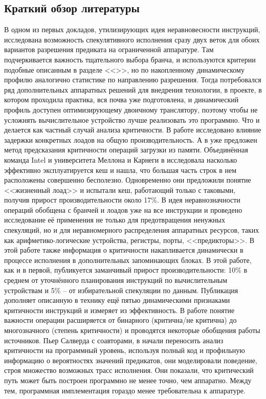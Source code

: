\documentclass[a4paper,12pt,titlepage]{article}
\newcommand*{\chp}[1]{<<\nameref{chap:#1}>>}
\begin{document}
\subsection{Краткий обзор литературы}
В одном из первых докладов, утилизирующих идея неравновесности инструкций, \cite{dualpath} исследована возможность спекулятивного исполнения сразу двух веток для обоих вариантов разрешения предиката на ограниченной аппаратуре. Там подчеркивается важность тщательного выбора бранча, и используются критерии подобные описанным в разделе \chp{statsign}, но по накопленному динамическому профилю аналогично статистике по направлению разрешения.
Тогда потребовался ряд дополнительных аппаратных решений для внедрения технологии, в проекте, в котором проходила практика, вся почва уже подготовлена, и динамический профиль доступен оптимизирующему двоичному транслятору, поэтому чтобы не усложнять вычислительное устройство лучше реализовать это программно. Что и делается как частный случай анализа критичности. В работе \cite{loads} исследовано влияние задержки конкретных лоадов на общую производительность. А в \cite{localvscritical} уже предложен метод предсказания критичности операций загрузки из памяти. Объединённая команда Intel и университета Меллона и Карнеги в \cite{nonvital} исследовала насколько эффективно эксплуатируется кеш и нашла, что большая часть строк в нем расположены совершенно бесполезно. Одновременно они предложили понятие <<жизненный лоад>> и испытали кеш, работающий только с таковыми, получив прирост производительности около 17\%.
В \cite{isca} идея неравнозначности операций обобщена с бранчей и лоадов уже на все инструкции и проведено исследование её применения не только для предотвращения ненужных спекуляций, но и для неравномерного распределения аппаратных ресурсов, таких как арифметико-логические устройства, регистры, порты, <<предикторы>>. В этой работе также информация о критичности накапливается динамически в процессе исполнения в дополнительных запоминающих блоках. В этой работе, как и в первой, публикуется заманчивый прирост производительности: 10\% в среднем от уточнённого планирования инструкций по вычислительным устройствам и 5\% -- от избирательной спекуляции по данным.
Публикация \cite{dynpred} дополняет описанную в \cite{isca} технику ещё пятью динамическими признаками критичности инструкций и измеряет из эффективность. В работе \cite{pact} понятие важности операции расширяется от бинарного (критична/не критична) до многозначного (степень критичности) и проводятся некоторые обобщения работы источников. Пьер Салверда с соавторами, в \cite{construct} начали переносить анализ критичности на программный уровень, используя полный код и профильную информацию о вероятностях значений предикатов, они моделировали поведение, строя множество возможных трасс исполнения. Они показали, что критический путь может быть построен программно не менее точно, чем аппаратно. Между тем, программная имплементация гораздо менее требовательна к аппаратуре.
\end{document}
